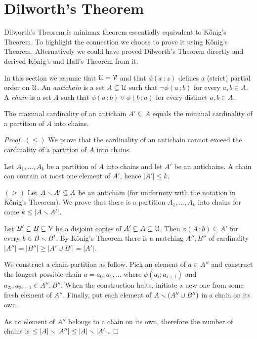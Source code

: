 \documentclass[scombinatorics.tex]{subfiles}
\begin{document}
\section{Dilworth's Theorem}\label{shadow}

Dilworth's Theorem is minimax theorem essentially equivalent to K\H{o}nig's Theorem.
To highlight the connection we choose to prove it using K\H{o}nig's Theorem. 
Alternatively we could have proved Dilworth's Theorem directly and derived K\H{o}nig's and Hall's Theorem from it.

In this section we assume that $\EuScript U=\EuScript V$ and that $\phi(x\,;z)$ defines a (strict) partial order on $\EuScript U$. An \emph{antichain\/} is a set $A\subseteq\EuScript U$ such that $\neg\phi(a\,;b)$ for every $a,b\in A$. A \emph{chain\/} is a set $A$ such that $\phi(a\,;b)\vee\phi(b\,;a)$ for every distinct $a,b\in A$.

\begin{void_thm}
   The maximal cardinality of an antichain $A'\subseteq A$ equals the minimal cardinality of a partition of $A$ into chains. 
\end{void_thm}

\begin{proof}
   $(\le)$ 
   We prove that the cardinality of an antichain cannot exceed the cardinality of a partition of $A$ into chains.

   Let $A_1,\dots,A_k$ be a partition of $A$ into chains and let $A'$ be an antichains.
   A chain can contain at most one element of $A'$, hence $|A'|\le k$.

   $(\ge)$  
   Let $A\smallsetminus A'\subseteq A$ be an antichain (for uniformity with the notation in K\H{o}nig's Theorem). 
   We prove that there is a partition $A_1,\dots,A_k$ into chains for some $k\le|A\smallsetminus A'|$.

   Let $B'\subseteq B\subseteq\EuScript V$ be a disjoint copies of $A'\subseteq A\subseteq\EuScript U$. 
   Then $\phi(A\,;b)\subseteq A'$ for every $b\in B\smallsetminus B'$.
   By K\H{o}nig's Theorem there is a matching $A'',B''$ of cardinality $|A''|=|B''|\ge|A'\cup B'|=|A'|$.

   We construct a chain-partition as follow.
   Pick an element of $a\in A''$ and construct the longest possible chain $a=a_0,a_1,\dots$ where $\phi(a_i;a_{i+1})$ and $a_{2i},a_{2i+1}\in A'',B''$.
   When the construction halts, initiate a new one from some fresh element of $A''$.
   Finally, put each element of $A\smallsetminus(A''\cup B'')$ in a chain on its own.
   
   As no element of $A''$ belongs to a chain on its own, therefore the number of chains is $\le |A|\smallsetminus |A''| \le |A|\smallsetminus |A'|$.
\end{proof}
\end{document}
